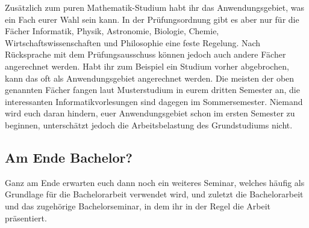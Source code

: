 Zusätzlich zum puren Mathematik-Studium habt ihr das Anwendungsgebiet, was ein Fach eurer Wahl sein kann. In der Prüfungsordnung gibt es aber nur für die Fächer Informatik, Physik, Astronomie, Biologie, Chemie, Wirtschaftswissenschaften und Philosophie eine feste Regelung. Nach Rücksprache mit dem Prüfungsausschuss können jedoch auch andere Fächer angerechnet werden. Habt ihr zum Beispiel ein Studium vorher abgebrochen, kann das oft als Anwendungsgebiet angerechnet werden. Die meisten der oben genannten Fächer fangen laut Musterstudium in eurem dritten Semester an, die interessanten Informatikvorlesungen sind dagegen im Sommersemester. Niemand wird euch daran hindern, euer Anwendungsgebiet schon im ersten Semester zu beginnen, unterschätzt jedoch die Arbeitsbelastung des Grundstudiums nicht.

\subsection{Am Ende Bachelor?}

Ganz am Ende erwarten euch dann noch ein weiteres Seminar, welches häufig als Grundlage für die Bachelorarbeit verwendet wird, und zuletzt die Bachelorarbeit und das zugehörige Bachelorseminar, in dem ihr in der Regel die Arbeit präsentiert.

